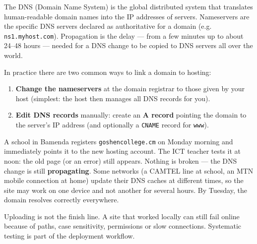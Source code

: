 \documentclass[11pt]{article}
\newcommand{\cle}[1]{{\popxbold\color{popdark}#1}}
\newcounter{popsec}
\newcounter{popsub}
\newcommand{\courssub}[1]{%
  \stepcounter{popsub}%
  \par\vspace{9pt}\noindent{\popxbold\fontsize{11.5}{13}\selectfont\color{popink}{\color{poporange}\thepopsec.\thepopsub}\hspace{6pt}#1}\par\nopagebreak\vspace{4pt}
}
\begin{document}
\begin{definition}
The \cle{DNS} (Domain Name System) is the global distributed system that translates human-readable domain names into the IP addresses of servers. \cle{Nameservers} are the specific DNS servers declared as authoritative for a domain (e.g. \texttt{ns1.myhost.com}). \cle{Propagation} is the delay — from a few minutes up to about 24--48 hours — needed for a DNS change to be copied to DNS servers all over the world.
\end{definition}

In practice there are two common ways to link a domain to hosting:

\begin{enumerate}
\item \textbf{Change the nameservers} at the domain registrar to those given by your host (simplest: the host then manages all DNS records for you).
\item \textbf{Edit DNS records} manually: create an \textbf{A record} pointing the domain to the server's IP address (and optionally a \texttt{CNAME} record for \texttt{www}).
\end{enumerate}

\begin{exemplebox}
A school in Bamenda registers \texttt{goshencollege.cm} on Monday morning and immediately points it to the new hosting account. The ICT teacher tests it at noon: the old page (or an error) still appears. Nothing is broken — the DNS change is still \textbf{propagating}. Some networks (a CAMTEL line at school, an MTN mobile connection at home) update their DNS caches at different times, so the site may work on one device and not another for several hours. By Tuesday, the domain resolves correctly everywhere.
\end{exemplebox}

\courssub{Testing the Live Website}

Uploading is not the finish line. A site that worked locally can still fail online because of paths, case sensitivity, permissions or slow connections. Systematic testing is part of the deployment workflow.
\end{document}
